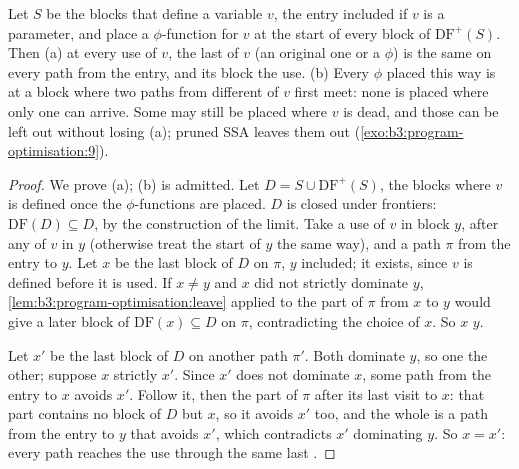 \begin{theorem}\label{thm:b3:program-optimisation:phi}
Let $S$ be the blocks that define a variable $v$, the entry included if $v$ is a parameter, and place a $\phi$-function for $v$ at the start of every block of $\mathrm{DF}^{+}(S)$. Then (a) at every use of $v$, the last  of $v$ (an original one or a $\phi$) is the same on every path from the entry, and its block  the use. (b) Every $\phi$ placed this way is at a block where two paths from different  of $v$ first meet: none is placed where only one  can arrive. Some may still be placed where $v$ is dead, and those can be left out without losing (a); pruned SSA leaves them out (\cref{exo:b3:program-optimisation:9}).
\end{theorem}

\begin{proof}
We prove (a); (b) is admitted. Let $D = S \cup \mathrm{DF}^{+}(S)$, the blocks where $v$ is defined once the $\phi$-functions are placed. $D$ is closed under frontiers: $\mathrm{DF}(D) \subseteq D$, by the construction of the limit. Take a use of $v$ in block $y$, after any  of $v$ in $y$ (otherwise treat the start of $y$ the same way), and a path $\pi$ from the entry to $y$. Let $x$ be the last block of $D$ on $\pi$, $y$ included; it exists, since $v$ is defined before it is used. If $x \ne y$ and $x$ did not strictly dominate $y$, \cref{lem:b3:program-optimisation:leave} applied to the part of $\pi$ from $x$ to $y$ would give a later block of $\mathrm{DF}(x) \subseteq D$ on $\pi$, contradicting the choice of $x$. So $x$  $y$.

Let $x'$ be the last block of $D$ on another path $\pi'$. Both dominate $y$, so one  the other; suppose $x$ strictly  $x'$. Since $x'$ does not dominate $x$, some path from the entry to $x$ avoids $x'$. Follow it, then the part of $\pi$ after its last visit to $x$: that part contains no block of $D$ but $x$, so it avoids $x'$ too, and the whole is a path from the entry to $y$ that avoids $x'$, which contradicts $x'$ dominating $y$. So $x = x'$: every path reaches the use through the same last .
\end{proof}

